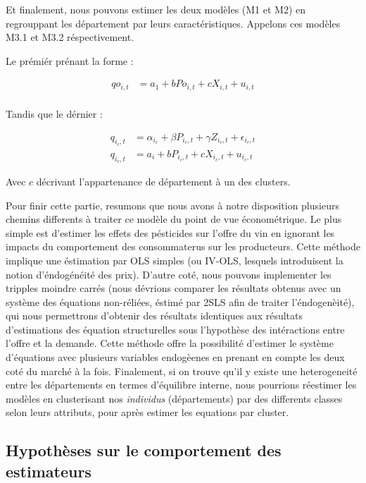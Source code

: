 \documentclass[11pt,]{article}
\begin{document}
Et finalement, nous pouvons estimer les deux modèles (M1 et M2) en
regrouppant les département par leurs caractéristiques. Appelons ces
modèles M3.1 et M3.2 réspectivement.

Le prémiér prénant la forme :

\begin{align*}
  qo_{i,t} & = a_1 + b Po_{i,t} + c X_{i,t} + u_{i,t} \\ 
\end{align*}

Tandis que le dérnier :

\begin{align*}
  q_{i_{c},t} & = \alpha_{i_{c}} + \beta P_{i_{c},t} + \gamma Z_{i_{c},t} + \epsilon_{i_{c},t} \\
  q_{i_{c},t} & = a_i + b P_{i_{c},t} + c X_{i_{c},t} + u_{i_{c},t}
\end{align*}

Avec \(c\) décrivant l'appartenance de département à un des clusters.

Pour finir cette partie, resumons que nous avons à notre disposition
plusieurs chemins differents à traiter ce modèle du point de vue
économétrique. Le plus simple est d'estimer les effets des pésticides
sur l'offre du vin en ignorant les impacts du comportement des
consommaterus sur les producteurs. Cette méthode implique une éstimation
par OLS simples (ou IV-OLS, lesquels introduisent la notion
d'éndogénéité des prix). D'autre coté, nous pouvons implementer les
tripples moindre carrés (nous dévrions comparer les résultats obtenus
avec un système des équations non-réliées, éstimé par 2SLS afin de
traiter l'éndogenèité), qui nous permettrons d'obtenir des résultats
identiques aux résultats d'estimations des équation structurelles sous
l'hypothèse des intéractions entre l'offre et la demande. Cette méthode
offre la possibilité d'estimer le système d'équations avec plusieurs
variables endogèenes en prenant en compte les deux coté du marché à la
fois. Finalement, si on trouve qu'il y existe une heterogeneité entre
les départements en termes d'équilibre interne, nous pourrions réestimer
les modèles en clusterisant nos \emph{individus} (départements) par des
differents classes selon leurs attributs, pour après estimer les
equations par cluster.

\hypertarget{hypotheses-sur-le-comportement-des-estimateurs}{%
\subsection{Hypothèses sur le comportement des
estimateurs}\label{hypotheses-sur-le-comportement-des-estimateurs}}
\end{document}
